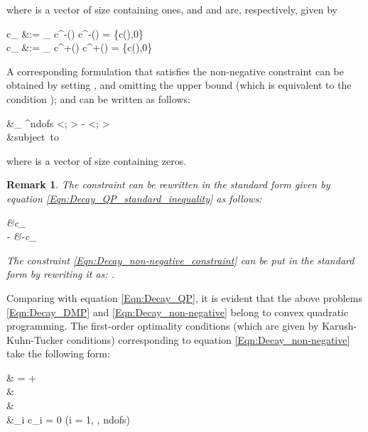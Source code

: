 \documentclass[11pt]{amsart}
\newtheorem{remark}[theorem]{Remark}
\begin{document}
where  is a vector of size  containing ones, and 
 and  are, respectively, given by

    c_{} &:= \min_{ \in \partial \Omega} c^{-}() \; 
     \; c^{-}() = \min\{c(),0\} \\
    c_{} &:= \max_{ \in \partial \Omega} c^{+}() \; 
     \; c^{+}() = \max\{c(),0\}
  
A corresponding formulation that satisfies the non-negative constraint can be obtained 
by setting , and omitting the upper bound (which is equivalent to 
the condition ); and can be written as follows:

    &_{ \in {}^{ndofs}} \quad  
     <;   >  - 
    <; > \\
\label{Eqn:Decay_non-negative_constraint}
    &\mbox{subject to} \quad {} \preceq {}  
  
where  is a vector of size  containing zeros. 
\begin{remark}
  The constraint  can be rewritten in the standard form given by 
  equation \eqref{Eqn:Decay_QP_standard_inequality} as follows:
  
       &\preceq c_{}  \\
      -  &\preceq -c_{}  
    
  The constraint \eqref{Eqn:Decay_non-negative_constraint} can be put in the 
  standard form by rewriting it as: .
\end{remark}

Comparing with equation \eqref{Eqn:Decay_QP}, it is evident that the above problems  
\eqref{Eqn:Decay_DMP} and \eqref{Eqn:Decay_non-negative} belong to convex quadratic 
programming. The first-order optimality conditions (which are given by Karush-Kuhn-Tucker 
conditions) corresponding to equation \eqref{Eqn:Decay_non-negative} take the following 
form:

    &  =  + \boldsymbol{\lambda} \\
    \label{Eqn:Decay_QP_inequality}
    & \succeq {} \\
    \label{Eqn:Decay_QP_lambda_inequality}
    &\boldsymbol{\lambda} \succeq {} \\
    \label{Eqn:Decay_QP_complementary_conditions}
    &\lambda_{i} c_{i} = 0 \quad (i = 1, \cdots, ndofs)
  
\end{document}
